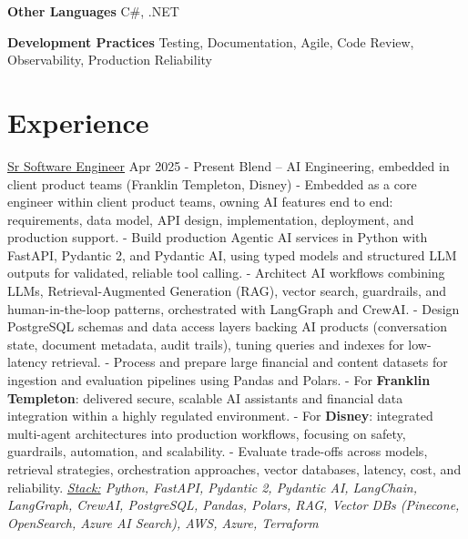 \documentclass[a4paper]{ThirtyNinesecondscv}
\begin{document}
\textbf{Other Languages}
\newline
C\#, .NET

\textbf{Development Practices}
\newline
Testing, Documentation, Agile, Code Review, Observability, Production Reliability

\section{Experience}


\begin{minipage}{\linewidth}
{\large\underline{Sr Software Engineer}}  \hspace*{22pt} Apr 2025 - Present
\newline
Blend -- AI Engineering, embedded in client product teams (Franklin Templeton, Disney)
\newline- Embedded as a core engineer within client product teams, owning AI features end to end: requirements, data model, API design, implementation, deployment, and production support.
\newline- Build production Agentic AI services in Python with FastAPI, Pydantic 2, and Pydantic AI, using typed models and structured LLM outputs for validated, reliable tool calling.
\newline- Architect AI workflows combining LLMs, Retrieval-Augmented Generation (RAG), vector search, guardrails, and human-in-the-loop patterns, orchestrated with LangGraph and CrewAI.
\newline- Design PostgreSQL schemas and data access layers backing AI products (conversation state, document metadata, audit trails), tuning queries and indexes for low-latency retrieval.
\newline- Process and prepare large financial and content datasets for ingestion and evaluation pipelines using Pandas and Polars.
\newline- For \textbf{Franklin Templeton}: delivered secure, scalable AI assistants and financial data integration within a highly regulated environment.
\newline- For \textbf{Disney}: integrated multi-agent architectures into production workflows, focusing on safety, guardrails, automation, and scalability.
\newline- Evaluate trade-offs across models, retrieval strategies, orchestration approaches, vector databases, latency, cost, and reliability.
\newline\textit{\underline{Stack:} Python, FastAPI, Pydantic 2, Pydantic AI, LangChain, LangGraph, CrewAI, PostgreSQL, Pandas, Polars, RAG, Vector DBs (Pinecone, OpenSearch, Azure AI Search), AWS, Azure, Terraform}
\end{minipage}
\par\vspace{6pt}
\end{document}
